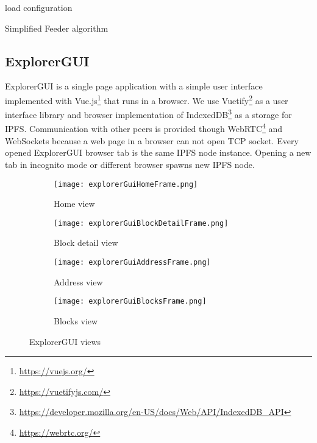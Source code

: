 \begin{algorithm}[H]
    \SetAlgoLined
    load configuration\;
    \caption{Simplified Feeder algorithm}
    \label{feederAlgo}
\end{algorithm}


\subsection{ExplorerGUI}
ExplorerGUI is a single page application with a simple user interface implemented with Vue.js\footnote{\url{https://vuejs.org/}} that runs in a browser. We use Vuetify\footnote{\url{https://vuetifyjs.com/}} as a user interface library and browser implementation of IndexedDB\footnote{\url{https://developer.mozilla.org/en-US/docs/Web/API/IndexedDB_API}} as a storage for IPFS. Communication with other peers is provided though WebRTC\footnote{\url{https://webrtc.org/}} and WebSockets because a web page in a browser can not open TCP socket. Every opened ExplorerGUI browser tab is the same IPFS node instance. Opening a new tab in incognito mode or different browser spawns new IPFS node.


\begin{figure}[h]
    \centering
    \begin{subfigure}[t]{.5\textwidth}
        \centering
        \texttt{[image: explorerGuiHomeFrame.png]}
        \caption{Home view}
        \label{homeView}
    \end{subfigure}%
    \begin{subfigure}[t]{.5\textwidth}
        \centering
        \texttt{[image: explorerGuiBlockDetailFrame.png]}
        \caption{Block detail view}
        \label{blockDetailView}
    \end{subfigure}
    \begin{subfigure}[t]{.5\textwidth}
        \centering
        \texttt{[image: explorerGuiAddressFrame.png]}
        \caption{Address view}
        \label{addressView}
    \end{subfigure}%
    \begin{subfigure}[t]{.5\textwidth}
        \centering
        \texttt{[image: explorerGuiBlocksFrame.png]}
        \caption{Blocks view}
        \label{blocksView}
    \end{subfigure}
    \caption{ExplorerGUI views}
\end{figure}


